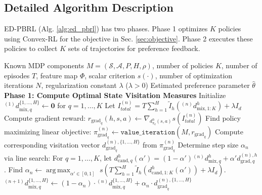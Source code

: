 \documentclass{article}
\DeclareMathOperator*{\argmax}{arg\,max}
\newcommand{\mS}{\mathcal{S}}
\newcommand{\mA}{\mathcal{A}}
\begin{document}
\subsection{Detailed Algorithm Description}
\label{sec:appendix_detailed_algorithm_description}

ED-PBRL (Alg. \ref{alg:ed_pbrl}) has two phases. Phase 1 optimizes $K$ policies using Convex-RL for the objective in Sec. \ref{sec:objective}. Phase 2 executes these policies to collect $K$ sets of trajectories for preference feedback.

\begin{algorithm}[p]
\caption{ED-PBRL using Convex-RL (Detailed Version of Algorithm \ref{alg:ed_pbrl_short})}
\label{alg:ed_pbrl}
\small
\begin{algorithmic}
 Known MDP components $M=(\mS, \mA, P, H, \rho)$, number of policies $K$, number of episodes $T$, feature map $\Phi$, scalar criterion $s(\cdot)$, number of optimization iterations $N$, regularization constant $\lambda$ ($\lambda > 0$)
 Estimated preference parameter $\hat{\theta}$
\smallskip
\STATE \textbf{Phase 1: Compute Optimal State Visitation Measures} 
\smallskip
    \STATE Initialize ${}^{(1)}d_{\text{mix},q}^{\{1,\ldots,H\}} \leftarrow \mathbf{0}$ for $q=1,\dots,K$ 
        \STATE Let $I_{total}^{(n)} = T \sum_{h=1}^H \tilde{I}_h({}^{(n)}d_{\text{mix},1:K}^h) + \lambda I_d$ 
            \STATE Compute gradient reward: $r_{\text{grad}_q}(h,s,a) \leftarrow \nabla_{d_{\pi_q}^h(s,a)} s(I_{total}^{(n)})$
            \STATE Find policy maximizing linear objective: $\pi_{\text{grad}_q}^{(n)} \leftarrow \texttt{value\_iteration}(M, r_{\text{grad}_q})$
            \STATE Compute corresponding visitation vector $d_{\text{grad}_q}^{(n),\{1,\ldots,H\}}$ from $\pi_{\text{grad}_q}^{(n)}$
        \ENDFOR
        \STATE Determine step size $\alpha_n$ via line search: For $q=1,\dots,K$, let $d_{\text{cand},q}^h(\alpha') = (1-\alpha'){}^{(n)}d_{\text{mix},q}^h + \alpha' d_{\text{grad},q}^{(n),h}$.
        \STATE \quad Find $\alpha_n \leftarrow \argmax_{\alpha' \in [0,1]}$ $s\!\left( T \sum_{h=1}^H \tilde{I}_h(d_{\text{cand},1:K}^h(\alpha')) + \lambda I_d \right)$.
            \STATE ${}^{(n+1)}d_{\text{mix},q}^{\{1,\ldots,H\}} \leftarrow (1-\alpha_n) \cdot {}^{(n)}d_{\text{mix},q}^{\{1,\ldots,H\}} + \alpha_n \cdot d_{\text{grad}_q}^{(n),\{1,\ldots,H\}}$

\end{algorithmic}
\end{algorithm}
\end{document}

